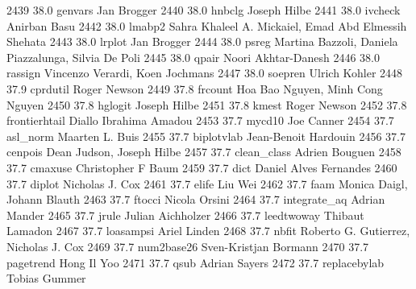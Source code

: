   2439     38.0    genvars       Jan Brogger                             
  2440     38.0    hnbclg        Joseph Hilbe                            
  2441     38.0    ivcheck       Anirban Basu                            
  2442     38.0    lmabp2        Sahra Khaleel A. Mickaiel, Emad Abd     
                                   Elmessih Shehata                        
  2443     38.0    lrplot        Jan Brogger                             
  2444     38.0    psreg         Martina Bazzoli, Daniela Piazzalunga,   
                                   Silvia De Poli                          
  2445     38.0    qpair         Noori Akhtar-Danesh                     
  2446     38.0    rassign       Vincenzo Verardi, Koen Jochmans         
  2447     38.0    soepren       Ulrich Kohler                           
  2448     37.9    cprdutil      Roger Newson                            
  2449     37.8    frcount       Hoa Bao Nguyen, Minh Cong Nguyen        
  2450     37.8    hglogit       Joseph Hilbe                            
  2451     37.8    kmest         Roger Newson                            
  2452     37.8    frontierhtail  Diallo Ibrahima Amadou                  
  2453     37.7    mycd10        Joe Canner                              
  2454     37.7    asl_norm      Maarten L. Buis                         
  2455     37.7    biplotvlab    Jean-Benoit Hardouin                    
  2456     37.7    cenpois       Dean Judson, Joseph Hilbe               
  2457     37.7    clean_class   Adrien Bouguen                          
  2458     37.7    cmaxuse       Christopher F Baum                      
  2459     37.7    dict          Daniel Alves Fernandes                  
  2460     37.7    diplot        Nicholas J. Cox                         
  2461     37.7    elife         Liu Wei                                 
  2462     37.7    faam          Monica Daigl, Johann Blauth             
  2463     37.7    ftocci        Nicola Orsini                           
  2464     37.7    integrate_aq  Adrian Mander                           
  2465     37.7    jrule         Julian Aichholzer                       
  2466     37.7    leedtwoway    Thibaut Lamadon                         
  2467     37.7    loasampsi     Ariel Linden                            
  2468     37.7    nbfit         Roberto G. Gutierrez, Nicholas J. Cox   
  2469     37.7    num2base26    Sven-Kristjan Bormann                   
  2470     37.7    pagetrend     Hong Il Yoo                             
  2471     37.7    qsub          Adrian Sayers                           
  2472     37.7    replacebylab  Tobias Gummer                           
